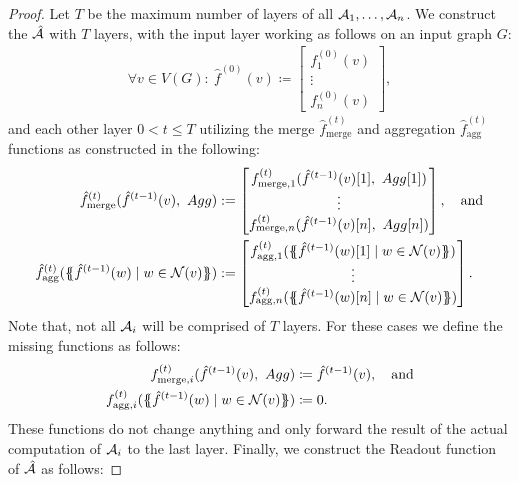 \begin{proof}
    Let $T$ be the maximum number of layers of all $\mathcal{A}_1, \dots, \mathcal{A}_n$. We construct the \gnn $\hat{\mathcal{A}}$ with $T$ layers, with the input layer working as follows on an input graph $G$:
    \begin{align*}
        \forall v \in V(G): \ \hat{f}^{(0)}(v) \coloneqq \begin{bmatrix}
            f^{(0)}_1(v)\\
            \vdots\\
            f^{(0)}_n(v)
        \end{bmatrix},
    \end{align*}
    and each other layer $0 < t \leq T$ utilizing the merge $\hat{f}^{(t)}_{\text{merge}}$ and aggregation $\hat{f}^{(t)}_{\text{agg}}$ functions as constructed in the following:
    \begin{align*}
        \hat{f}^{(t)}_{\text{merge}} (\hat{f}^{(t-1)}(v), \ Agg) &:= \begin{bmatrix}
            f^{(t)}_{\text{merge}, 1}(\hat{f}^{(t-1)}(v)[1],\ Agg[1])\\
            \vdots\\
            f^{(t)}_{\text{merge}, n}(\hat{f}^{(t-1)}(v)[n],\ Agg[n])
        \end{bmatrix},\quad \text{and}\\
        \hat{f}^{(t)}_{\text{agg}}(\MSopen \hat{f}^{(t-1)}(w) \mid w \in \mathcal{N}(v) \MSclose ) &:= \begin{bmatrix}
            f^{(t)}_{\text{agg}, 1}(\MSopen \hat{f}^{(t-1)}(w)[1] \mid w \in \mathcal{N}(v) \MSclose)\\
            \vdots\\
            f^{(t)}_{\text{agg}, n}(\MSopen \hat{f}^{(t-1)}(w)[n] \mid w \in \mathcal{N}(v) \MSclose)
        \end{bmatrix}.
    \end{align*}
    Note that, not all $\mathcal{A}_i$ will be comprised of $T$ layers. For these cases we define the missing functions as follows:
    \begin{align*}
        f^{(t)}_{\text{merge}, i}(\hat{f}^{(t-1)}(v), \ Agg) &\coloneqq \hat{f}^{(t-1)}(v), \quad \text{and}\\
        f^{(t)}_{\text{agg}, i}(\{\!\!\{ \hat{f}^{(t-1)}(w) \mid w \in \mathcal{N}(v) \}\!\!\}) &\coloneqq 0.
    \end{align*}
    These functions do not change anything and only forward the result of the actual computation of $\mathcal{A}_i$ to the last layer. Finally, we construct the \textsf{Readout} function of $\hat{\mathcal{A}}$ as follows:

\end{proof}
